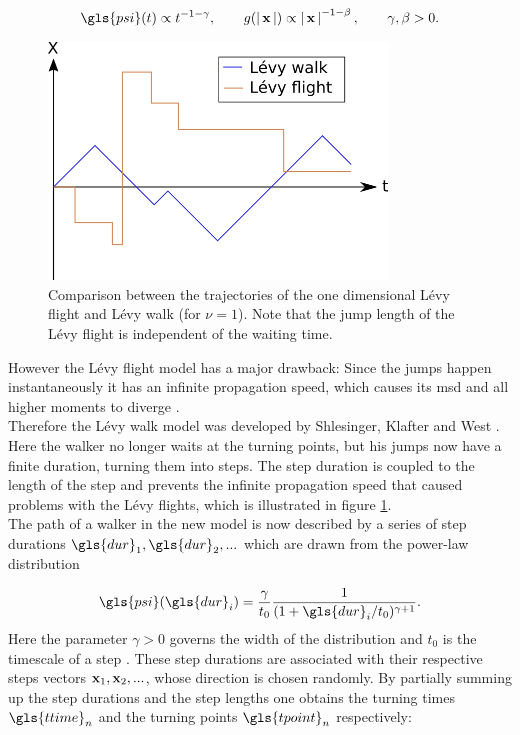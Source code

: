 \begin{align}
\gls{psi}(t) \propto t^{-1-\gamma}, \qquad g(\abs{\ve{x}}) \propto \abs{\ve{x}}^{-1-\beta}, \qquad \gamma, \beta > 0.
\end{align} 
%
\begin{figure}
\begin{center}
\includegraphics[width=90mm]{pics/levyFlight.png}
\caption{Comparison between the trajectories of the one dimensional L\'evy flight and L\'evy walk (for $\nu=1$). Note that the jump length of the L\'evy flight is independent of the waiting time. 
\label{fig:levyFlight}}
\end{center}
\end{figure}
%
However the L\'evy flight model has a major drawback: Since the jumps happen instantaneously it has an infinite propagation speed, which causes its \gls{msd} and all higher moments to diverge \cite{lwreview}. \\


Therefore the L\'evy walk model was developed by Shlesinger, Klafter and West \cite{shlesinger1987}. Here the walker no longer waits at the turning points, but his jumps now have a finite duration, turning them into steps. The step duration is coupled to the length of the step and prevents the infinite propagation speed that caused problems with the L\'evy flights, which is illustrated in figure \ref{fig:levyFlight}. \\

The path of a walker in the new model is now described by a series of step durations $\gls{dur}_1, \gls{dur}_2, ...$ which are drawn from the power-law distribution 

\begin{align}
\gls{psi}(\gls{dur}_i) = \frac{\gamma}{t_0} \frac{1}{(1+\gls{dur}_i/t_0)^{\gamma+1}} .
\end{align}
%
Here the parameter $\gamma>0$ governs the width of the distribution and { \color{red}$t_0$ is the timescale of a step }. These step durations are associated with their respective steps vectors $\mathbf{ x }_1, \mathbf{ x }_2, ...$, whose direction is chosen randomly. By partially summing up the step durations and the step lengths one obtains the turning times $\gls{ttime}_n$ and the turning points $\gls{tpoint}_n$ respectively:

